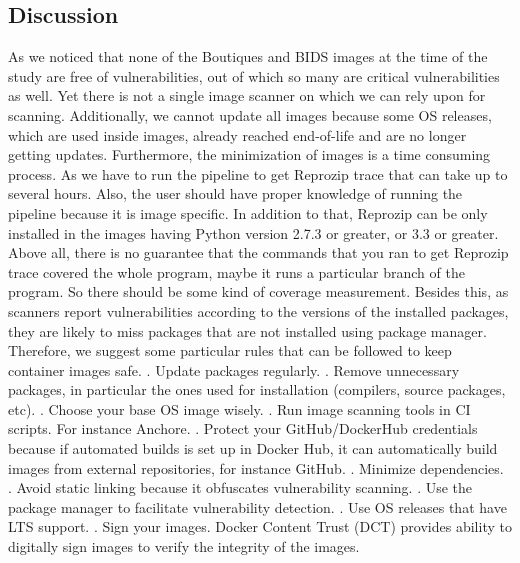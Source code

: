 \documentclass[a4paper,num-refs]{oup-contemporary}
\begin{document}
\subsection{Discussion}

As we noticed that none of the Boutiques and BIDS images at the time of the study are free of vulnerabilities, out of which
so many are critical vulnerabilities as well. Yet there is not a single image scanner on which we can rely upon for
scanning. Additionally, we cannot update all images because some OS releases, which are used inside images, 
already reached end-of-life and are
no longer getting updates. Furthermore, the minimization of images is a time consuming process. As we have to run
the pipeline to get Reprozip trace that can take up to several hours. Also, the user should have proper knowledge
of running the pipeline because it is image specific. In addition to that, Reprozip can be only installed
in the images having Python version 2.7.3 or greater, or 3.3 or greater. Above all, there is no guarantee that
the commands that you ran to get Reprozip trace covered the whole program, maybe it runs a particular
branch of the program. So there should be some kind of coverage measurement.
Besides this, as scanners report vulnerabilities according to the versions of the installed packages,
they are likely to miss packages that are not installed using package manager. 
Therefore, we suggest some particular rules that can be
followed to keep container images safe.
. Update packages regularly.
. Remove unnecessary packages, in particular the ones used for installation (compilers, source packages, etc).
. Choose your base OS image wisely.
. Run image scanning tools in CI scripts. For instance Anchore.
. Protect your GitHub/DockerHub credentials because if automated builds is set up
in Docker Hub, it can automatically build images from external repositories, for instance GitHub.
. Minimize dependencies.
. Avoid static linking because it obfuscates vulnerability scanning.
. Use the package manager to facilitate vulnerability detection.
. Use OS releases that have LTS support.
. Sign your images. Docker Content Trust (DCT) provides ability to digitally sign
images to verify the integrity of the images.
\end{document}
